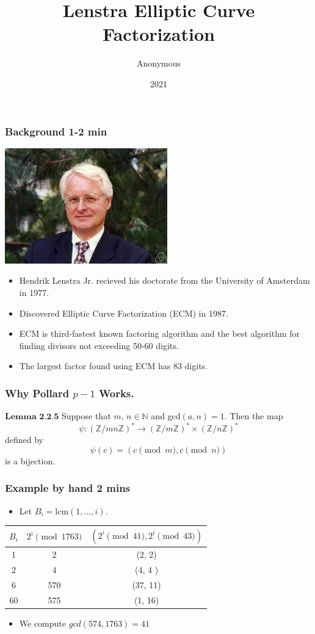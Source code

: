 \documentclass{beamer}
\title{Lenstra Elliptic Curve Factorization}
\author{Anonymous}
\institute{MATH 317}
\date{2021}
\begin{document}
\frame{\titlepage}


\begin{frame}
\frametitle{Background 1-2 min}

\center
\includegraphics[scale = .5]{lenstra.jpeg}

\begin{itemize}
\item Hendrik Lenstra Jr. recieved his doctorate from the University of Amsterdam in 1977.

\item Discovered Elliptic Curve Factorization (ECM) in 1987.

\item ECM is third-fastest known factoring algorithm and the best algorithm for finding divisors not exceeding 50-60 digits.

\item The largest factor found using ECM has 83 digits.
\end{itemize}
\end{frame}

\begin{frame}
\frametitle{Why Pollard $p-1$ Works.}
$\textbf{Lemma 2.2.5}$ Suppose that $m$, $n \in \mathbb{N}$ and gcd$(a,n) = 1$. Then the map
$$
    \psi : \left( \mathbb{Z}/mn\mathbb{Z} \right)^* \rightarrow \left( \mathbb{Z}/m\mathbb{Z} \right)^* \times \left( \mathbb{Z}/n\mathbb{Z} \right)^* 
$$
defined by 
$$
    \psi(c) = (c \pmod{m}, c\pmod{n})
$$
is a bijection.

\end{frame}


\begin{frame}
\frametitle{Example by hand 2 mins}

\begin{itemize}
\item Let $B_i = \text{lcm}(1,\ldots, i)$.
\end{itemize}

\center
\begin{tabular}{c|c|c}

$B_i$ & $2^i \pmod{1763} $& $(2^i \pmod{41}, 2^i \pmod{43})$ \\
\hline 
1 & 2 & (2,  2) \\
2 & 4 &  (4, 4 )\\
6 &570 & (37, 11) \\
60 & 575 & (1, 16)
\end{tabular}

\begin{itemize}
\item We compute $gcd(574, 1763) = 41$
\end{itemize}
\end{frame}
\end{document}
